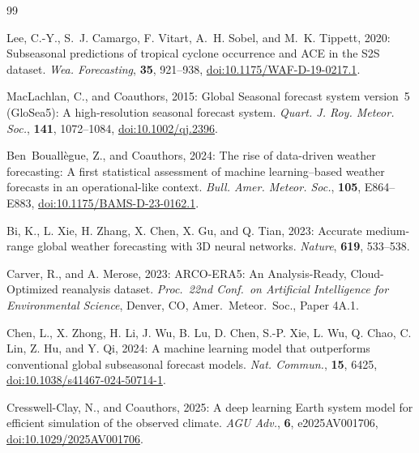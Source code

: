 \documentclass[11pt,a4paper]{article}
\providecommand{\doi}[1]{\href{https://doi.org/#1}{doi:#1}}
\begin{document}
\begin{thebibliography}{99}

Lee, C.-Y., S.~J. Camargo, F. Vitart, A.~H. Sobel, and M.~K. Tippett, 2020:
Subseasonal predictions of tropical cyclone occurrence and ACE in the S2S dataset.
\textit{Wea. Forecasting}, \textbf{35}, 921--938,
\doi{10.1175/WAF-D-19-0217.1}.

MacLachlan, C., and Coauthors, 2015: Global Seasonal forecast system version~5
(GloSea5): A high-resolution seasonal forecast system.
\textit{Quart. J. Roy. Meteor. Soc.}, \textbf{141}, 1072--1084,
\doi{10.1002/qj.2396}.

Ben~Bouall\`egue, Z., and Coauthors, 2024: The rise of data-driven
weather forecasting: A first statistical assessment of machine
learning--based weather forecasts in an operational-like context.
\textit{Bull. Amer. Meteor. Soc.}, \textbf{105}, E864--E883,
\doi{10.1175/BAMS-D-23-0162.1}.

Bi, K., L. Xie, H. Zhang, X. Chen, X. Gu, and Q. Tian, 2023: Accurate
medium-range global weather forecasting with 3D neural networks.
\textit{Nature}, \textbf{619}, 533--538.

Carver, R., and A. Merose, 2023: ARCO-ERA5: An Analysis-Ready,
Cloud-Optimized reanalysis dataset. \textit{Proc.\ 22nd Conf.\ on
Artificial Intelligence for Environmental Science}, Denver, CO,
Amer.\ Meteor.\ Soc., Paper 4A.1.

Chen, L., X. Zhong, H. Li, J. Wu, B. Lu, D. Chen, S.-P. Xie, L. Wu,
Q. Chao, C. Lin, Z. Hu, and Y. Qi, 2024: A machine learning model
that outperforms conventional global subseasonal forecast models.
\textit{Nat. Commun.}, \textbf{15}, 6425,
\doi{10.1038/s41467-024-50714-1}.

Cresswell-Clay, N., and Coauthors, 2025: A deep learning Earth system
model for efficient simulation of the observed climate.
\textit{AGU Adv.}, \textbf{6}, e2025AV001706,
\doi{10.1029/2025AV001706}.


\end{thebibliography}
\end{document}
